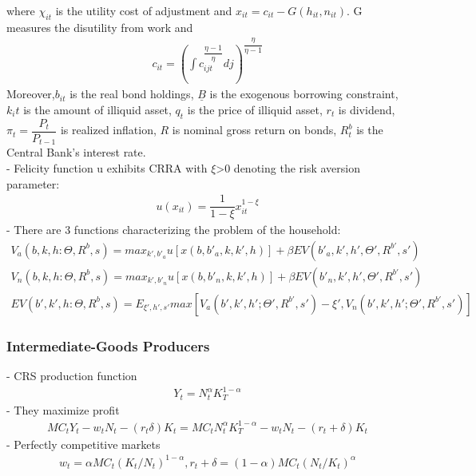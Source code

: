 \documentclass[titlepage]{\econtex}
\begin{document}
where $\chi_{it}$ is the utility cost of adjustment and  $x_{it}= c_{it}-G(h_{it},n_{it})$.
G measures the disutility from work and
\begin{align}
  c_{it} = \left(\int c_{ijt}^{\dfrac{\eta-1}{\eta}}dj\right)^{\dfrac{\eta}{\eta-1}}
\end{align}
Moreover,$b_{it}$ is the real bond holdings, $\underline{B}$ is the exogenous borrowing constraint, $k_it$ is the amount of illiquid asset, $q_{t}$ is the price of illiquid asset,  $r_t$ is dividend, $\pi_{t}=\dfrac{P_t}{P_{t-1}}$ is realized inflation,  $R$ is nominal gross return on bonds, $R_t^b$ is the Central Bank's interest rate.\\
- Felicity function u exhibits CRRA with $\xi$>0 denoting the risk aversion parameter:\\
\begin{align}
  u(x_{it})=\dfrac{1}{1-\xi}x_{it}^{1-\xi}
\end{align}
- There are 3 functions characterizing the problem of the household:\\
\begin{align}
V_{a}(b,k,h:\Theta,R^{b},s) = max_{k',b'_{a}}u[x(b,b'_{a},k,k',h)]+\beta EV(b'_{a},k',h',\Theta',R^{b'},s')\\
V_{n}(b,k,h:\Theta,R^{b},s) = max_{k',b'_{n}}u[x(b,b'_{n},k,k',h)]+\beta EV(b'_{n},k',h',\Theta',R^{b'},s')\\
EV(b',k',h:\Theta,R^{b},s) = E_{\xi',h',s'} {max[V_{a}(b',k',h';\Theta',R^{b'},s') - \xi', V_{n}(b',k',h';\Theta',R^{b'},s')]}
\end{align}

\hypertarget{Intermediate-Goods Producers}{}
\subsubsection{Intermediate-Goods Producers}

- CRS production function\\
\begin{align}
  Y_{t} = N_{t}^{\alpha}K_{T}^{1-\alpha}
\end{align}
- They maximize profit\\
\begin{align}
MC_{t}Y_{t} -w_{t}N_{t} -(r_{t}\delta)K_{t} = MC_{t}N_{t}^{\alpha}K_{T}^{1-\alpha} - w_{t}N_{t}-(r_{t}+\delta)K_{t}
\end{align}
- Perfectly competitive markets\\
\begin{align}
  w_t = \alpha MC_{t}\left(K_{t}/N_{t}\right)^ {1-\alpha}, r_{t}+\delta = (1-\alpha)MC_{t}(N_{t}/K_{t})^{\alpha}
\end{align}
\end{document}
